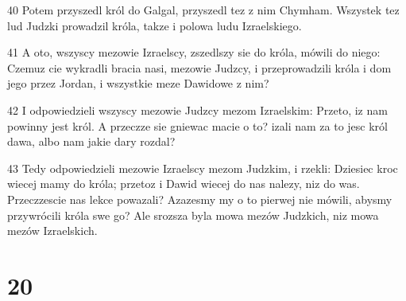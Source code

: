 \par 40 Potem przyszedl król do Galgal, przyszedl tez z nim Chymham. Wszystek tez lud Judzki prowadzil króla, takze i polowa ludu Izraelskiego.
\par 41 A oto, wszyscy mezowie Izraelscy, zszedlszy sie do króla, mówili do niego: Czemuz cie wykradli bracia nasi, mezowie Judzcy, i przeprowadzili króla i dom jego przez Jordan, i wszystkie meze Dawidowe z nim?
\par 42 I odpowiedzieli wszyscy mezowie Judzcy mezom Izraelskim: Przeto, iz nam powinny jest król. A przeczze sie gniewac macie o to? izali nam za to jesc król dawa, albo nam jakie dary rozdal?
\par 43 Tedy odpowiedzieli mezowie Izraelscy mezom Judzkim, i rzekli: Dziesiec kroc wiecej mamy do króla; przetoz i Dawid wiecej do nas nalezy, niz do was. Przeczzescie nas lekce powazali? Azazesmy my o to pierwej nie mówili, abysmy przywrócili króla swe go? Ale srozsza byla mowa mezów Judzkich, niz mowa mezów Izraelskich.

\chapter{20}

